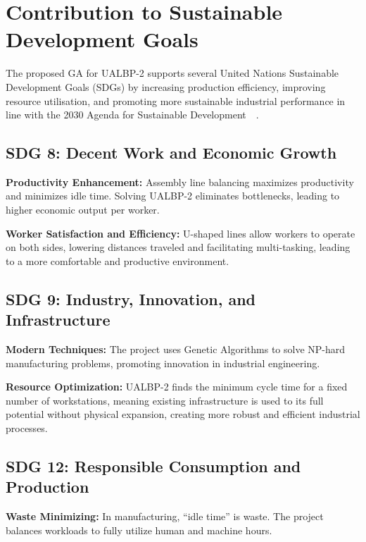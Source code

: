 \documentclass[12pt,a4paper]{article}
\begin{document}
\newpage
\section{Contribution to Sustainable Development Goals}
The proposed GA for UALBP-2 supports several United Nations Sustainable Development Goals (SDGs) by increasing production efficiency, improving resource utilisation, and promoting more sustainable industrial performance in line with the 2030 Agenda for Sustainable Development~~\cite{un_2030_agenda_2015}.

\par
\subsection*{SDG 8: Decent Work and Economic Growth}

\noindent\textbf{Productivity Enhancement:} Assembly line balancing maximizes productivity and minimizes idle time. Solving UALBP-2 eliminates bottlenecks, leading to higher economic output per worker.

\noindent\textbf{Worker Satisfaction and Efficiency:} U-shaped lines allow workers to operate on both sides, lowering distances traveled and facilitating multi-tasking, leading to a more comfortable and productive environment.

\par
\subsection*{SDG 9: Industry, Innovation, and Infrastructure}

\noindent\textbf{Modern Techniques:} The project uses Genetic Algorithms to solve NP-hard manufacturing problems, promoting innovation in industrial engineering.

\noindent\textbf{Resource Optimization:} UALBP-2 finds the minimum cycle time for a fixed number of workstations, meaning existing infrastructure is used to its full potential without physical expansion, creating more robust and efficient industrial processes.

\par
\subsection*{SDG 12: Responsible Consumption and Production}

\noindent\textbf{Waste Minimizing:} In manufacturing, ``idle time'' is waste. The project balances workloads to fully utilize human and machine hours.
\end{document}
